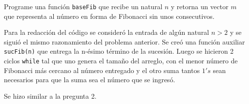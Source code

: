 \documentclass[letterpaper,10pt]{article}
\begin{document}
\begin{tcolorbox}
 Programe una función \texttt{baseFib} que recibe un natural $n$ y retorna un vector $m$ que representa al número en forma de Fibonacci sin unos consecutivos.
\end{tcolorbox}

Para la redacción del código se consideró la entrada de algún natural $n>2$ y se siguió el mismo razonamiento del problema anterior. Se creó una función auxiliar \texttt{sucFib(n)} que entrega la n-ésimo término de la sucesión. Luego se hicieron 2 ciclos \texttt{while} tal que uno genera el tamaño del arreglo, con el menor número de Fibonacci más cercano al número entregado y el otro suma tantos $1's$ sean necesarios para que la suma sea el número que se ingresó.

 Se hizo similar a la pregunta 2.
\end{document}
